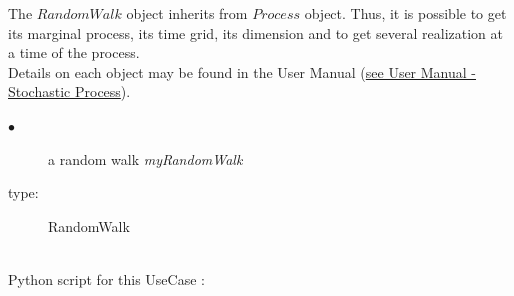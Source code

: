 The $RandomWalk$ object inherits from $Process$ object. Thus, it is possible to get its marginal process, its time grid, its dimension and to get several realization at a time of the process.\\

Details on each object may be found in the User Manual  (\href{OpenTURNS_UserManual_TUI.pdf}{see User Manual - Stochastic Process}).\\

{
  \begin{description}
  \item[$\bullet$] a random walk {\itshape myRandomWalk}
  \item[type:]  RandomWalk
  \end{description}
}

\textspace\\
Python script for this UseCase :

